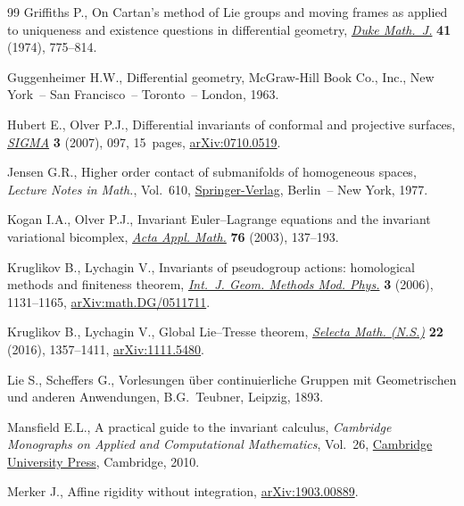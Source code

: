\documentclass[10pt,a4paper]{amsart}
\numberwithin{equation}{section}
\begin{document}
\begin{thebibliography}{99}
Griffiths P., On {C}artan's method of {L}ie groups and moving frames as applied
 to uniqueness and existence questions in differential geometry, \href{https://doi.org/10.1215/S0012-7094-74-04180-5}{\textit{Duke
 Math.~J.}} \textbf{41} (1974), 775--814.

Guggenheimer H.W., Differential geometry, McGraw-Hill Book Co., Inc., New
 York~-- San Francisco~-- Toronto~-- London, 1963.

Hubert E., Olver P.J., Differential invariants of conformal and projective
 surfaces, \href{https://doi.org/10.3842/SIGMA.2007.097}{\textit{SIGMA}} \textbf{3} (2007), 097, 15~pages,
 \href{https://arxiv.org/abs/0710.0519}{arXiv:0710.0519}.

Jensen G.R., Higher order contact of submanifolds of homogeneous spaces,
 \textit{Lecture Notes in Math.}, Vol.~610, \href{https://doi.org/10.1007/BFb0068415}{Springer-Verlag}, Berlin~-- New
 York, 1977.

Kogan I.A., Olver P.J., Invariant {E}uler--{L}agrange equations and the
 invariant variational bicomplex, \href{https://doi.org/10.1023/A:1022993616247}{\textit{Acta Appl. Math.}} \textbf{76}
 (2003), 137--193.

Kruglikov B., Lychagin V., Invariants of pseudogroup actions: homological
 methods and finiteness theorem, \href{https://doi.org/10.1142/S0219887806001478}{\textit{Int.~J. Geom. Methods Mod. Phys.}}
 \textbf{3} (2006), 1131--1165, \href{https://arxiv.org/abs/math.DG/0511711}{arXiv:math.DG/0511711}.

Kruglikov B., Lychagin V., Global {L}ie--{T}resse theorem, \href{https://doi.org/10.1007/s00029-015-0220-z}{\textit{Selecta
 Math. (N.S.)}} \textbf{22} (2016), 1357--1411, \href{https://arxiv.org/abs/1111.5480}{arXiv:1111.5480}.

Lie S., Scheffers G., Vorlesungen \"uber continuierliche {G}ruppen mit
 {G}eometrischen und anderen {A}nwendungen, B.G.~Teubner, Leipzig, 1893.

Mansfield E.L., A practical guide to the invariant calculus, \textit{Cambridge
 Monographs on Applied and Computational Mathematics}, Vol.~26, \href{https://doi.org/10.1017/CBO9780511844621}{Cambridge
 University Press}, Cambridge, 2010.

Merker J., Affine rigidity without integration, \href{https://arxiv.org/abs/1903.00889}{arXiv:1903.00889}.


\end{thebibliography}
\end{document}
